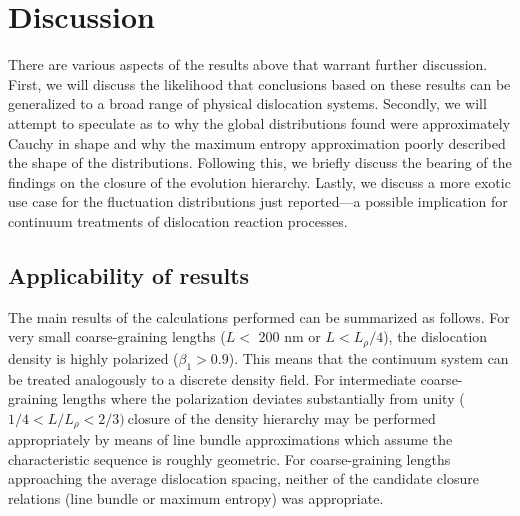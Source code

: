 \section{Discussion\label{sec:6_disc}}

There are various aspects of the results above that warrant further discussion. First, we will discuss the likelihood that conclusions based on these results can be generalized to a broad range of physical dislocation systems. Secondly, we will attempt to speculate as to why the global distributions found were approximately Cauchy in shape and why the maximum entropy approximation poorly described the shape of the distributions. Following this, we briefly discuss the bearing of the findings on the closure of the evolution hierarchy. Lastly, we discuss a more exotic use case for the fluctuation distributions just reported---a possible implication for continuum treatments of dislocation reaction processes.

\subsection{Applicability of results}\label{applicability-of-results}
The main results of the calculations performed can be summarized as follows. For very small coarse-graining lengths (\(L <\) 200 nm or \(L < L_{\rho}/4\)), the dislocation density is highly polarized (\(\beta_{1} > 0.9\)). This means that the continuum system can be treated analogously to a discrete density field. For intermediate coarse-graining lengths where the polarization deviates substantially from unity (\(1/4 < L/L_\rho < 2/3)\ \)closure of the density hierarchy may be performed appropriately by means of line bundle approximations which assume the characteristic sequence is roughly geometric. For coarse-graining lengths approaching the average dislocation spacing, neither of the candidate closure relations (line bundle or maximum entropy) was appropriate.

